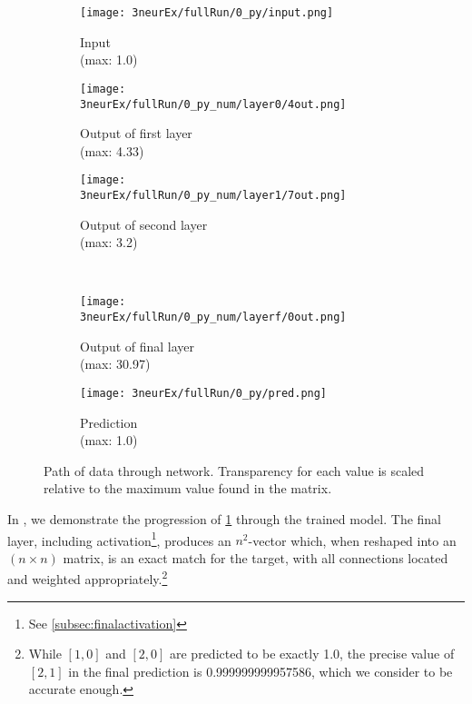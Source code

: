 \label{subsec:trainedoperation}
\begin{figure}[h]
	\centering
	\begin{subfigure}{.15\textwidth}
		\centering
		\texttt{[image: 3neurEx/fullRun/0\_py/input.png]}
		\caption{Input\\(max: 1.0)}
		\label{subfig:3neur_in}
	\end{subfigure}
	\hspace{.5em}
	\begin{subfigure}{.35\textwidth}
		\texttt{[image: 3neurEx/fullRun/0\_py\_num/layer0/4out.png]}
		\caption{Output of first layer\\(max: 4.33)}
	\end{subfigure}
	\hspace{1em}
	\begin{subfigure}{.35\textwidth}
		\texttt{[image: 3neurEx/fullRun/0\_py\_num/layer1/7out.png]}
		\caption{Output of second layer\\(max: 3.2)}
		\label{subfig:3neur_out1}
	\end{subfigure}
	\\
	\begin{subfigure}{.35\textwidth}
		\centering
		\texttt{[image: 3neurEx/fullRun/0\_py\_num/layerf/0out.png]}
		\caption{Output of final layer\\(max: 30.97)}
		\label{subfig:3neur_outf}
	\end{subfigure}
	\begin{subfigure}{.3\textwidth}
		\centering
		\texttt{[image: 3neurEx/fullRun/0\_py/pred.png]}
		\caption{Prediction\\(max: 1.0)}
		\label{subfig:3neur_pred}
	\end{subfigure}
	\caption{Path of data through network. Transparency for each value is scaled 
	relative to the maximum value found in the matrix.}
	\label{fig:3neur_run}
\end{figure}\noindent
In , we demonstrate the progression of 
\ref{subfig:3neur_in} through the trained model. The final layer, including 
activation\footnote{See \ref{subsec:finalactivation}}, produces an $n^2$-vector 
which, when reshaped into an $(n \times n)$ matrix, is an exact match for the 
target, with all connections located and weighted appropriately.\footnote{While 
	$[1,0]$ and $[2,0]$ are predicted to be exactly 1.0, the precise value of 
	$[2,1]$ in the final prediction is 0.999999999957586, which we consider to 
be accurate enough.}
